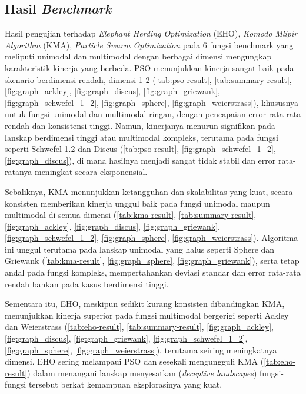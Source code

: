 \subsection{Hasil \textit{Benchmark}}
Hasil pengujian terhadap \textit{Elephant Herding Optimization} (EHO), \textit{Komodo Mlipir Algorithm} (KMA), \textit{Particle Swarm Optimization} pada 6 fungsi benchmark yang meliputi unimodal dan multimodal dengan berbagai dimensi mengungkap karakteristik kinerja yang berbeda. PSO menunjukkan kinerja sangat baik pada skenario berdimensi rendah, dimensi 1-2 (\cref{tab:pso-result}, \cref{tab:summary-result}, \cref{fig:graph_ackley}, \cref{fig:graph_discus}, \cref{fig:graph_griewank}, \cref{fig:graph_schwefel_1_2}, \cref{fig:graph_sphere}, \cref{fig:graph_weierstrass}), khususnya untuk fungsi unimodal dan multimodal ringan, dengan pencapaian error rata-rata rendah dan konsistensi tinggi. Namun, kinerjanya menurun signifikan pada lanskap berdimensi tinggi atau multimodal kompleks, terutama pada fungsi seperti Schwefel 1.2 dan Discus (\cref{tab:pso-result}, \cref{fig:graph_schwefel_1_2},  \cref{fig:graph_discus}), di mana hasilnya menjadi sangat tidak stabil dan error rata-ratanya meningkat secara eksponensial.

Sebaliknya, KMA menunjukkan ketangguhan dan skalabilitas yang kuat, secara konsisten memberikan kinerja unggul baik pada fungsi unimodal maupun multimodal di semua dimensi (\cref{tab:kma-result}, \cref{tab:summary-result}, \cref{fig:graph_ackley}, \cref{fig:graph_discus}, \cref{fig:graph_griewank}, \cref{fig:graph_schwefel_1_2}, \cref{fig:graph_sphere}, \cref{fig:graph_weierstrass}). Algoritma ini unggul terutama pada lanskap unimodal yang halus seperti Sphere dan Griewank (\cref{tab:kma-result}, \cref{fig:graph_sphere}, \cref{fig:graph_griewank}), serta tetap andal pada fungsi kompleks, mempertahankan deviasi standar dan error rata-rata rendah bahkan pada kasus berdimensi tinggi.

Sementara itu, EHO, meskipun sedikit kurang konsisten dibandingkan KMA, menunjukkan kinerja superior pada fungsi multimodal bergerigi seperti Ackley dan Weierstrass (\cref{tab:eho-result}, \cref{tab:summary-result}, \cref{fig:graph_ackley}, \cref{fig:graph_discus}, \cref{fig:graph_griewank}, \cref{fig:graph_schwefel_1_2}, \cref{fig:graph_sphere}, \cref{fig:graph_weierstrass}), terutama seiring meningkatnya dimensi. EHO sering melampaui PSO dan sesekali mengungguli KMA (\cref{tab:eho-result}) dalam menangani lanskap menyesatkan (\textit{deceptive landscapes}) fungsi-fungsi tersebut berkat kemampuan eksplorasinya yang kuat.


